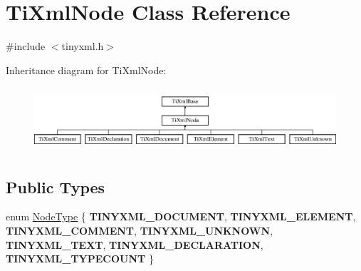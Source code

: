 \hypertarget{class_ti_xml_node}{
\section{\-Ti\-Xml\-Node \-Class \-Reference}
\label{class_ti_xml_node}
}


{\ttfamily \#include $<$tinyxml.\-h$>$}

\-Inheritance diagram for \-Ti\-Xml\-Node\-:\begin{figure}[H]
\begin{center}
\leavevmode
\includegraphics[height=2.413793cm]{class_ti_xml_node}
\end{center}
\end{figure}
\subsection*{\-Public \-Types}
\begin{DoxyCompactItemize}
\item 
enum \hyperlink{class_ti_xml_node_a836eded4920ab9e9ef28496f48cd95a2}{\-Node\-Type} \{ \*
{\bfseries \-T\-I\-N\-Y\-X\-M\-L\-\_\-\-D\-O\-C\-U\-M\-E\-N\-T}, 
{\bfseries \-T\-I\-N\-Y\-X\-M\-L\-\_\-\-E\-L\-E\-M\-E\-N\-T}, 
{\bfseries \-T\-I\-N\-Y\-X\-M\-L\-\_\-\-C\-O\-M\-M\-E\-N\-T}, 
{\bfseries \-T\-I\-N\-Y\-X\-M\-L\-\_\-\-U\-N\-K\-N\-O\-W\-N}, 
\*
{\bfseries \-T\-I\-N\-Y\-X\-M\-L\-\_\-\-T\-E\-X\-T}, 
{\bfseries \-T\-I\-N\-Y\-X\-M\-L\-\_\-\-D\-E\-C\-L\-A\-R\-A\-T\-I\-O\-N}, 
{\bfseries \-T\-I\-N\-Y\-X\-M\-L\-\_\-\-T\-Y\-P\-E\-C\-O\-U\-N\-T}
 \}
\end{DoxyCompactItemize}
